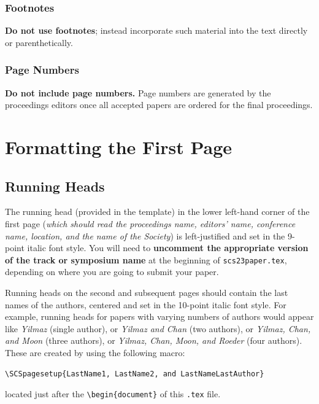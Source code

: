 \documentclass{scspaperproc}
\theoremstyle{scsthe}
\begin{document}
\subsubsection{Footnotes}
\textbf{Do not use footnotes}; instead incorporate such material into the text directly or parenthetically.

\subsubsection{Page Numbers}
\textbf{Do not include page numbers.} Page numbers are generated by the proceedings editors once all accepted papers are ordered for the final proceedings.


\section{Formatting the First Page}

\subsection{Running Heads}
The running head (provided in the template) in the lower left-hand corner of the first page (\textit{which should read the proceedings name, editors' name, conference name, location, and the name of the Society}) is left-justified and set in the 9-point italic font style. %
You will need to \textbf{uncomment the appropriate version of the track or symposium name} at the beginning of \texttt{scs23paper.tex}, depending on where you are going to submit your paper.

Running heads on the second and subsequent pages should contain the last names of the authors, centered and set in the 10-point italic font style. For example, running heads for papers with varying numbers of authors would appear like \emph{Yilmaz} (single author), or \emph{Yilmaz and Chan} (two authors), or \emph{Yilmaz, Chan, and Moon} (three authors), or \emph{Yilmaz, Chan, Moon, and Roeder} (four authors). These are created by using the following macro:

\noindent \begin{verbatim}
\SCSpagesetup{LastName1, LastName2, and LastNameLastAuthor}
\end{verbatim}

located just after the \verb+\begin{document}+ of this \texttt{.tex} file.
\end{document}
